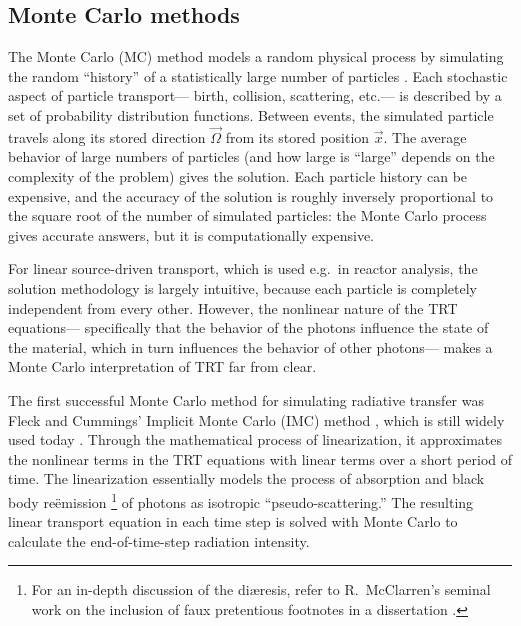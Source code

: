 \subsection{Monte Carlo methods}

The Monte Carlo (MC) method models a random
physical process by simulating the random ``history'' of a statistically large
number
of particles \cite{Bro2004a}. Each stochastic aspect of particle transport---%
birth, collision, scattering, etc.---%
is described by a set of probability distribution functions. Between
events, the simulated particle travels along its stored direction
$\vec{\Omega}$ from its stored position $\vec{x}$. The average behavior of
large numbers of particles (and how large is ``large'' depends on the
complexity of the problem) gives the solution. Each particle history can be
expensive, and the accuracy of the solution is roughly inversely proportional
to the
square root of the number of simulated particles: the Monte Carlo process
gives accurate answers, but it is computationally expensive. 

For linear source-driven transport, which is used e.g.~in reactor analysis, the
solution
methodology is largely intuitive, because each particle is
completely independent from every other. However, the nonlinear nature of the
TRT equations---%
specifically that the behavior of the photons influence the state of the
material, which in turn influences the behavior of other photons---%
makes a Monte Carlo interpretation of TRT far from clear.

The first successful Monte Carlo method for simulating radiative
transfer was Fleck and Cummings' Implicit Monte Carlo (IMC) method
\cite{Fle1971,Wol2008}, which is still widely used today \cite{Urb2006}.
Through the
mathematical process of linearization, it approximates the nonlinear terms in
the TRT equations with linear terms over a short period of time. The
linearization essentially models the process of absorption and
black body re\"emission%
\footnote{For an in-depth discussion of the di\ae resis, refer to R.~McClarren's
  seminal work on the inclusion of faux pretentious footnotes in a dissertation
\cite[p.18]{McC2007}.}%
of photons as isotropic ``pseudo-scattering.'' The resulting linear
transport equation in each time step is solved with Monte Carlo to calculate the
end-of-time-step radiation intensity.

